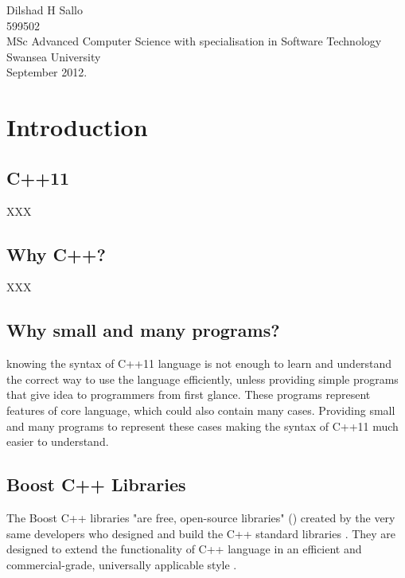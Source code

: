 \documentclass[11pt]{report}
\begin{document}
\begin{flushright}
Dilshad H Sallo\\
599502\\
MSc Advanced Computer Science with specialisation in Software Technology\\
Swansea University\\
September 2012.
\end{flushright}

\tableofcontents
\listoffigures

\chapter{Introduction}
\label{cha:intro}


\section{C++11}
\label{sec: C++11}

XXX

\section{Why C++?}
\label{sec: why C++}

XXX

\section{Why small and many programs?}
\label{sec:small and many programs}
knowing the syntax of C++11 language is not enough to learn and understand the correct way to use the language efficiently, unless providing  simple  programs that give idea to programmers from first glance.  These programs represent features of core language, which could also contain many cases. Providing small and many programs to represent these cases making the syntax of C++11 much easier to understand.

\section{Boost C++ Libraries}
\label{sec: Boost}
The Boost C++ libraries "are free, open-source libraries" (\cite{Deitel:2012:CPP}) created by the very same developers who designed and build the C++ standard libraries \cite{Schaling:2011:BoostCppLibraries}. They are designed to extend the functionality of C++ language in an efficient and commercial-grade, universally applicable style \cite{Boost:2007:Cpp}.
\end{document}
